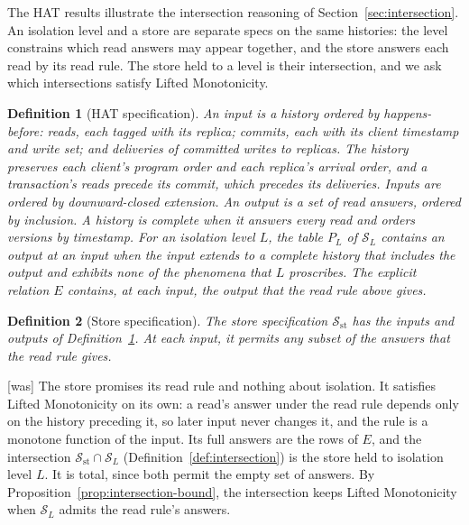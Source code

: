 \documentclass[sigconf]{cidr-2027}
\newtheorem{definition}{Definition}
\theoremstyle{remark}
\newcommand{\Spec}{\mathcal{S}}
\begin{document}
The HAT results illustrate the intersection reasoning of
Section~\ref{sec:intersection}.  An isolation level and a store are separate
specs on the same histories: the level constrains which read answers may
appear together, and the store answers each read by its read rule.  The store
held to a level is their intersection, and we ask which intersections satisfy
Lifted Monotonicity.

\begin{definition}[HAT specification]
\label{def:hat-spec}
An input is a history ordered by happens-before: reads, each tagged with its
replica; commits, each with its client timestamp and write set; and deliveries
of committed writes to replicas.  The history preserves
each client's program order and each replica's arrival order, and a
transaction's reads precede its commit, which precedes its deliveries.
Inputs are ordered by downward-closed extension.  An output is a set of read
answers, ordered by inclusion.  A history is \emph{complete} when it answers
every read and orders versions by timestamp.  For an isolation level $L$, the table $P_L$ of $\Spec_L$ contains
an output at an input when the input extends to a complete history that includes the output and exhibits
none of the phenomena that $L$ proscribes.  The explicit relation $E$
contains, at each input, the output that the read rule above gives.
\end{definition}

\begin{definition}[Store specification]
\label{def:store-spec}
The \emph{store specification} $\Spec_{\mathrm{st}}$ has the inputs and outputs
of Definition~\ref{def:hat-spec}.  At each input, it permits any subset of the
answers that the read rule gives.
\end{definition}



{\footnotesize\color{black!50}\noindent\textsf{[was]} The store promises its read rule and nothing about isolation.  It satisfies
Lifted Monotonicity on its own: a read's answer under the read rule depends
only on the history preceding it, so later input never changes it, and the rule
is a monotone function of the input.  Its full answers are the rows of $E$, and
the intersection $\Spec_{\mathrm{st}}\cap\Spec_L$
(Definition~\ref{def:intersection}) is the store held to isolation level $L$.
It is total, since both permit the empty set of answers.  By
Proposition~\ref{prop:intersection-bound}, the intersection keeps Lifted
Monotonicity when $\Spec_L$ admits the read rule's answers.\par}
\end{document}
